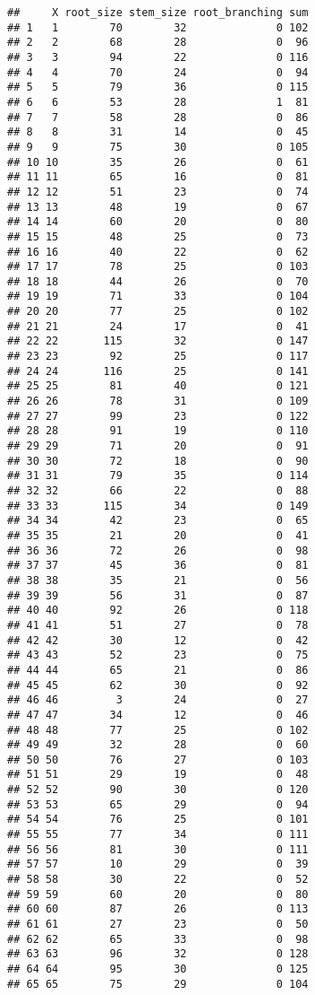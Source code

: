 \documentclass[
]{article}
\begin{document}
\begin{verbatim}
##     X root_size stem_size root_branching sum
## 1   1        70        32              0 102
## 2   2        68        28              0  96
## 3   3        94        22              0 116
## 4   4        70        24              0  94
## 5   5        79        36              0 115
## 6   6        53        28              1  81
## 7   7        58        28              0  86
## 8   8        31        14              0  45
## 9   9        75        30              0 105
## 10 10        35        26              0  61
## 11 11        65        16              0  81
## 12 12        51        23              0  74
## 13 13        48        19              0  67
## 14 14        60        20              0  80
## 15 15        48        25              0  73
## 16 16        40        22              0  62
## 17 17        78        25              0 103
## 18 18        44        26              0  70
## 19 19        71        33              0 104
## 20 20        77        25              0 102
## 21 21        24        17              0  41
## 22 22       115        32              0 147
## 23 23        92        25              0 117
## 24 24       116        25              0 141
## 25 25        81        40              0 121
## 26 26        78        31              0 109
## 27 27        99        23              0 122
## 28 28        91        19              0 110
## 29 29        71        20              0  91
## 30 30        72        18              0  90
## 31 31        79        35              0 114
## 32 32        66        22              0  88
## 33 33       115        34              0 149
## 34 34        42        23              0  65
## 35 35        21        20              0  41
## 36 36        72        26              0  98
## 37 37        45        36              0  81
## 38 38        35        21              0  56
## 39 39        56        31              0  87
## 40 40        92        26              0 118
## 41 41        51        27              0  78
## 42 42        30        12              0  42
## 43 43        52        23              0  75
## 44 44        65        21              0  86
## 45 45        62        30              0  92
## 46 46         3        24              0  27
## 47 47        34        12              0  46
## 48 48        77        25              0 102
## 49 49        32        28              0  60
## 50 50        76        27              0 103
## 51 51        29        19              0  48
## 52 52        90        30              0 120
## 53 53        65        29              0  94
## 54 54        76        25              0 101
## 55 55        77        34              0 111
## 56 56        81        30              0 111
## 57 57        10        29              0  39
## 58 58        30        22              0  52
## 59 59        60        20              0  80
## 60 60        87        26              0 113
## 61 61        27        23              0  50
## 62 62        65        33              0  98
## 63 63        96        32              0 128
## 64 64        95        30              0 125
## 65 65        75        29              0 104
\end{verbatim}
\end{document}
